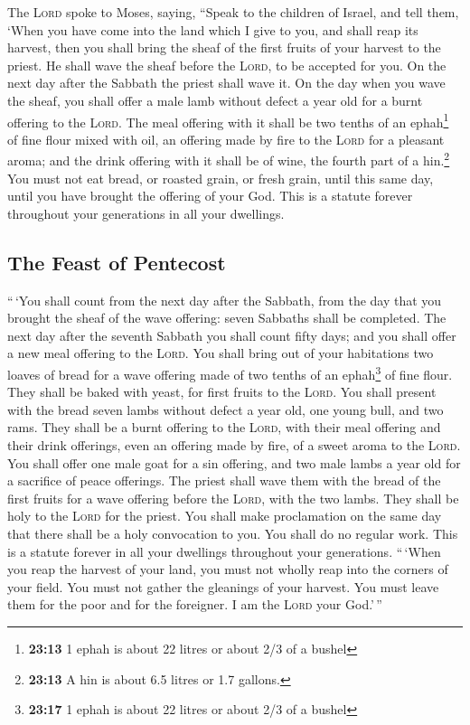  The \textsc{Lord} spoke to Moses, saying, 
``Speak to the children of Israel, and tell them, `When you have come
into the land which I give to you, and shall reap its harvest, then you
shall bring the sheaf of the first fruits of your harvest to the priest.
 He shall wave the sheaf before the \textsc{Lord}, to be
accepted for you. On the next day after the Sabbath the priest shall
wave it.  On the day when you wave the sheaf, you shall
offer a male lamb without defect a year old for a burnt offering to the
\textsc{Lord}.  The meal offering with it shall be two
tenths of an ephah\footnote{\textbf{23:13} 1 ephah is about 22 litres or
  about 2/3 of a bushel} of fine flour mixed with oil, an offering made
by fire to the \textsc{Lord} for a pleasant aroma; and the drink
offering with it shall be of wine, the fourth part of a hin.\footnote{\textbf{23:13}
  A hin is about 6.5 litres or 1.7 gallons.}  You must
not eat bread, or roasted grain, or fresh grain, until this same day,
until you have brought the offering of your God. This is a statute
forever throughout your generations in all your dwellings.

\hypertarget{the-feast-of-pentecost}{%
\subsection{The Feast of Pentecost}\label{the-feast-of-pentecost}}

 ``\,`You shall count from the next day after the
Sabbath, from the day that you brought the sheaf of the wave offering:
seven Sabbaths shall be completed.  The next day after
the seventh Sabbath you shall count fifty days; and you shall offer a
new meal offering to the \textsc{Lord}.  You shall bring
out of your habitations two loaves of bread for a wave offering made of
two tenths of an ephah\footnote{\textbf{23:17} 1 ephah is about 22
  litres or about 2/3 of a bushel} of fine flour. They shall be baked
with yeast, for first fruits to the \textsc{Lord}.  You
shall present with the bread seven lambs without defect a year old, one
young bull, and two rams. They shall be a burnt offering to the
\textsc{Lord}, with their meal offering and their drink offerings, even
an offering made by fire, of a sweet aroma to the \textsc{Lord}.
 You shall offer one male goat for a sin offering, and
two male lambs a year old for a sacrifice of peace offerings.
 The priest shall wave them with the bread of the first
fruits for a wave offering before the \textsc{Lord}, with the two lambs.
They shall be holy to the \textsc{Lord} for the priest. 
You shall make proclamation on the same day that there shall be a holy
convocation to you. You shall do no regular work. This is a statute
forever in all your dwellings throughout your generations.
 ``\,`When you reap the harvest of your land, you must
not wholly reap into the corners of your field. You must not gather the
gleanings of your harvest. You must leave them for the poor and for the
foreigner. I am the \textsc{Lord} your God.'\,''


